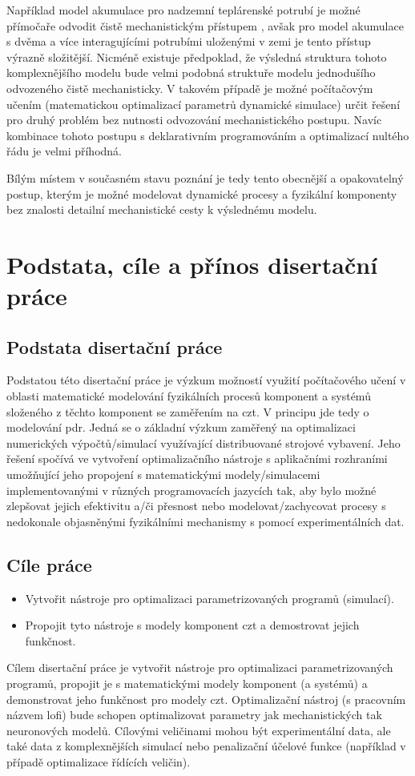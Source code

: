 Například model akumulace pro nadzemní teplárenské potrubí je možné přímočaře
odvodit čistě mechanistickým přístupem \cite{Kudela2019pipe}, avšak pro model
akumulace s dvěma a více interagujícími potrubími uloženými v zemi je tento
přístup výrazně složitější. Nicméně existuje předpoklad, že výsledná struktura
tohoto komplexnějšího modelu bude velmi podobná struktuře modelu jednodušího
odvozeného čistě mechanisticky. V takovém případě je možné počítačovým učením
(matematickou optimalizací parametrů dynamické simulace) určit řešení pro druhý
problém bez nutnosti odvozování mechanistického postupu. Navíc kombinace tohoto
postupu s deklarativním programováním a optimalizací nultého řádu je velmi
příhodná.

Bílým místem v současném stavu poznání je tedy tento obecnější a opakovatelný
postup, kterým je možné modelovat dynamické procesy a fyzikální komponenty bez
znalosti detailní mechanistické cesty k výslednému modelu.

\chapter{Podstata, cíle a přínos disertační práce}
\label{chap:Aims_of_disertation}
\section{Podstata disertační práce}
\label{sec:Podstata}
Podstatou této disertační práce je výzkum možností využití počítačového učení
v oblasti matematické modelování fyzikálních procesů komponent a systémů
složeného z těchto komponent se zaměřením na \acrshort{czt}. V principu jde
tedy o modelování \acrshort{pdr}. Jedná se o základní výzkum zaměřený na
optimalizaci numerických výpočtů/simulací využívající distribuované strojové
vybavení. Jeho řešení spočívá ve vytvoření optimalizačního nástroje s
aplikačními rozhraními umožňující jeho propojení s matematickými
modely/simulacemi implementovanými v různých programovacích jazycích tak, aby
bylo možné zlepšovat jejich efektivitu a/či přesnost nebo modelovat/zachycovat
procesy s nedokonale objasněnými fyzikálními mechanismy s pomocí
experimentálních dat.
\section{Cíle práce}
\label{sec:Aims}
\begin{itemize}
  \item
    Vytvořit nástroje pro optimalizaci parametrizovaných programů (simulací).
  \item
    Propojit tyto nástroje s modely komponent \acrshort{czt} a demostrovat
    jejich funkčnost.
\end{itemize}
Cílem disertační práce je vytvořit nástroje pro optimalizaci parametrizovaných
programů, propojit je s matematickými modely komponent (a systémů) a
demonstrovat jeho funkčnost pro modely \acrshort{czt}. Optimalizační nástroj
(s pracovním názvem \acrshort{lofi}) bude schopen optimalizovat parametry jak
mechanistických tak neuronových modelů. Cílovými veličinami mohou být
experimentální data, ale také data z komplexnějších simulací nebo penalizační
účelové funkce (například v případě optimalizace řídících veličin).
